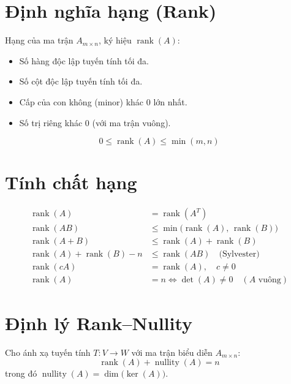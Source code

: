 
\section{Định nghĩa hạng (Rank)}

Hạng của ma trận $A_{m \times n}$, ký hiệu $\operatorname{rank}(A)$:
\begin{itemize}
    \item Số hàng độc lập tuyến tính tối đa.
    \item Số cột độc lập tuyến tính tối đa.
    \item Cấp của con không (minor) khác $0$ lớn nhất.
    \item Số trị riêng khác $0$ (với ma trận vuông).
\end{itemize}

\[
0 \le \operatorname{rank}(A) \le \min(m, n)
\]

\section{Tính chất hạng}

\begin{align}
\operatorname{rank}(A) &= \operatorname{rank}(A^T) \\
\operatorname{rank}(AB) &\le \min\bigl(\operatorname{rank}(A),\, \operatorname{rank}(B)\bigr) \\
\operatorname{rank}(A + B) &\le \operatorname{rank}(A) + \operatorname{rank}(B) \\
\operatorname{rank}(A) + \operatorname{rank}(B) - n &\le \operatorname{rank}(AB) \quad \text{(Sylvester)} \\
\operatorname{rank}(cA) &= \operatorname{rank}(A), \quad c \neq 0 \\
\operatorname{rank}(A) &= n \iff \det(A) \neq 0 \quad (A \text{ vuông})
\end{align}

\section{Định lý Rank--Nullity}

Cho ánh xạ tuyến tính $T: V \to W$ với ma trận biểu diễn $A_{m \times n}$:
\[
\operatorname{rank}(A) + \operatorname{nullity}(A) = n
\]
trong đó $\operatorname{nullity}(A) = \dim\bigl(\ker(A)\bigr)$.


